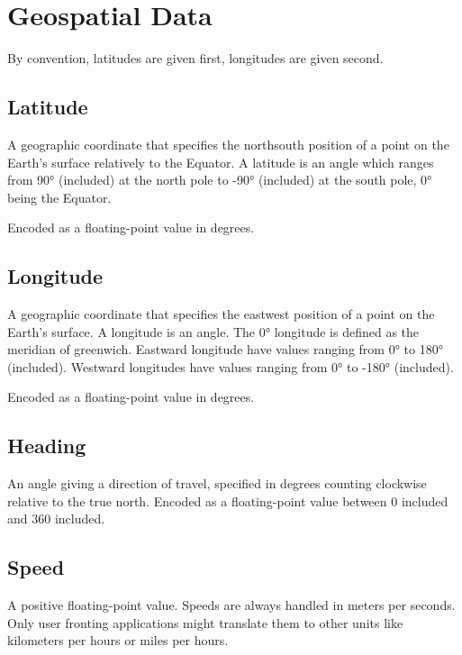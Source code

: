 \documentclass[letterpaper,10pt,english]{sphinxmanual}
\begin{document}
\section{Geospatial Data}
\label{\detokenize{taxonomy_serialization:geospatial-data}}
By convention, latitudes are given first, longitudes are given second.


\subsection{Latitude}
\label{\detokenize{taxonomy_serialization:latitude}}\label{\detokenize{taxonomy_serialization:id2}}
A geographic coordinate that specifies the north\textendash{}south position of a point on the Earth’s surface relatively to the Equator.
A latitude is an angle which ranges from 90° (included) at the north pole to -90° (included) at the south pole, 0° being the Equator.

Encoded as a floating-point value in degrees.


\subsection{Longitude}
\label{\detokenize{taxonomy_serialization:longitude}}\label{\detokenize{taxonomy_serialization:id3}}
A geographic coordinate that specifies the east\textendash{}west position of a point on the Earth’s surface.
A longitude is an angle.
The 0° longitude is defined as the meridian of greenwich.
Eastward longitude have values ranging from 0° to 180° (included).
Westward longitudes have values ranging from 0° to -180° (included).

Encoded as a floating-point value in degrees.


\subsection{Heading}
\label{\detokenize{taxonomy_serialization:heading}}\label{\detokenize{taxonomy_serialization:id4}}
An angle giving a direction of travel, specified in degrees counting clockwise relative to the true north.
Encoded as a floating-point value between 0 included and 360 included.


\subsection{Speed}
\label{\detokenize{taxonomy_serialization:speed}}\label{\detokenize{taxonomy_serialization:id5}}
A positive floating-point value.
Speeds are always handled in meters per seconds.
Only user fronting applications might translate them to other units like kilometers per hours or miles per hours.
\end{document}
